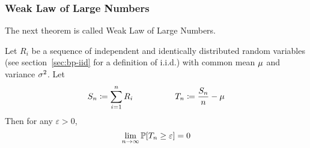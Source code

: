 \subsubsection{Weak Law of Large Numbers}
\label{sec:bp-weak-law}
%
The next theorem is called Weak Law of Large Numbers.
\begin{theorem}\label{thm:weak-lln}
  Let $R_i$ be a sequence of independent and identically distributed random variables
  (see section~\ref{sec:bp-iid} for a definition of i.i.d.)
  with common mean $\mu$ and variance $\sigma^2$. Let
  \[
      S_n \coloneqq \sum_{i=1}^n R_i \hspace{50pt}
      T_n \coloneqq \frac{S_n}{n} - \mu
  \]
  Then for any $\varepsilon > 0$,
  \[ \lim_{n\to\infty} \mathbb P[T_n \geq \varepsilon] = 0 \]
\end{theorem}

